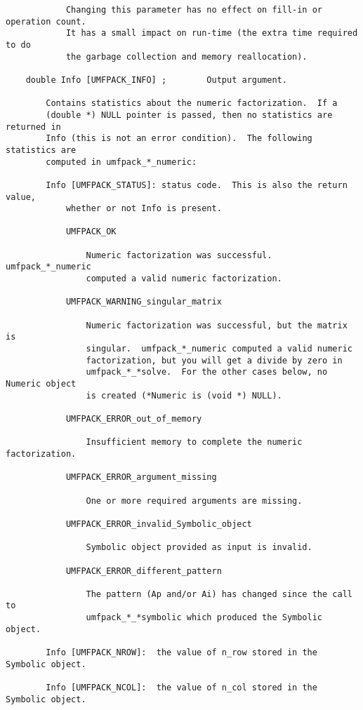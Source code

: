 {\begin{verbatim}
            Changing this parameter has no effect on fill-in or operation count.
            It has a small impact on run-time (the extra time required to do
            the garbage collection and memory reallocation).

    double Info [UMFPACK_INFO] ;        Output argument.

        Contains statistics about the numeric factorization.  If a
        (double *) NULL pointer is passed, then no statistics are returned in
        Info (this is not an error condition).  The following statistics are
        computed in umfpack_*_numeric:

        Info [UMFPACK_STATUS]: status code.  This is also the return value,
            whether or not Info is present.

            UMFPACK_OK

                Numeric factorization was successful.  umfpack_*_numeric
                computed a valid numeric factorization.

            UMFPACK_WARNING_singular_matrix

                Numeric factorization was successful, but the matrix is
                singular.  umfpack_*_numeric computed a valid numeric
                factorization, but you will get a divide by zero in
                umfpack_*_*solve.  For the other cases below, no Numeric object
                is created (*Numeric is (void *) NULL).
                
            UMFPACK_ERROR_out_of_memory

                Insufficient memory to complete the numeric factorization.

            UMFPACK_ERROR_argument_missing

                One or more required arguments are missing.

            UMFPACK_ERROR_invalid_Symbolic_object

                Symbolic object provided as input is invalid.

            UMFPACK_ERROR_different_pattern

                The pattern (Ap and/or Ai) has changed since the call to
                umfpack_*_*symbolic which produced the Symbolic object.

        Info [UMFPACK_NROW]:  the value of n_row stored in the Symbolic object.

        Info [UMFPACK_NCOL]:  the value of n_col stored in the Symbolic object.


\end{verbatim}}
